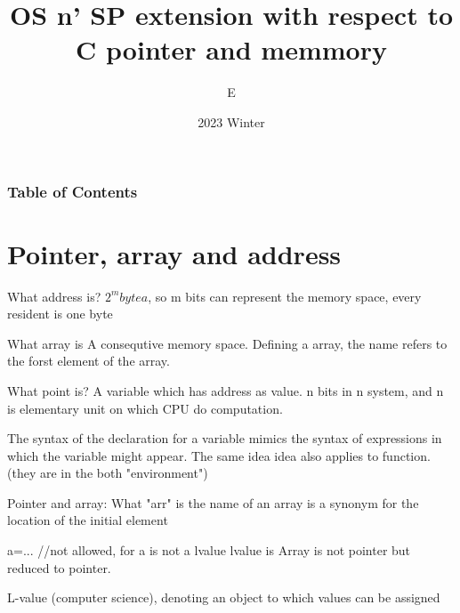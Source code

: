 \documentclass{beamer}
\title{OS n' SP extension with respect to C pointer and memmory}
\author{E}
\institute{University of Birmingham}
\date{2023 Winter}
\begin{document}
\frame{\titlepage}

\begin{frame}
    \frametitle{Table of Contents}
    \tableofcontents
\end{frame}


\section{Pointer, array and address}
\begin{frame}{What address is?}
  $2^m bytea$, so m bits can represent the memory space, every resident is one byte
\end{frame}

\begin{frame}{What array is}
  A consequtive memory space.
  Defining a array, the name refers to the forst element of the array.


\end{frame}



\begin{frame}{What point is?}
A variable which has address as value. n bits in n system, and n is elementary unit on which CPU do computation.

The syntax of the declaration for a variable mimics the syntax of expressions in which the variable might
appear. The same idea idea also applies to function.(they are in the both "environment")
\end{frame}

\begin{frame}{Pointer and array: What "arr" is}
  the name of an array is a synonym for the location of the initial element


  a=... //not allowed, for a is not a lvalue
  lvalue is 
  Array is not pointer but reduced to pointer.


  L-value (computer science), denoting an object to which values can be assigned

\end{frame}
\end{document}
